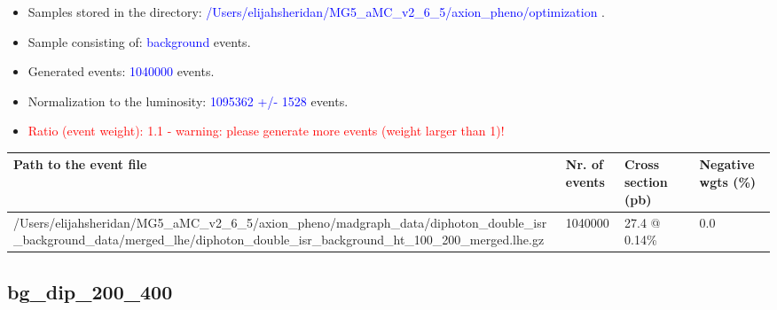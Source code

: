 \documentclass[a4paper, 10pt]{article}
\begin{document}
\begin{itemize}
  \item Samples stored in the directory: \textcolor{blue}{/\-Users/\-elijahsheridan/\-MG5\_aMC\_v2\_6\_5/\-axion\_pheno/\-optimization} .
   \item Sample consisting of: \textcolor{blue}{background}  events.
   \item Generated events: \textcolor{blue}{1040000 }  events.
   \item Normalization to the luminosity: \textcolor{blue}{1095362}\textcolor{blue}{ +/\-- }\textcolor{blue}{1528 }  events.
   \item\textcolor{red}{Ratio (event weight): }\textcolor{red}{1.1 }\textcolor{red}{ - warning: please generate more events (weight larger than 1)!}
\textcolor{red}{}
\end{itemize}
\begin{table}[H]
  \begin{center}
    \begin{tabular}{|m{55.0mm}|m{25.0mm}|m{30.0mm}|m{30.0mm}|}
      \hline
      {\cellcolor{yellow}         Path to the event file}& {\cellcolor{yellow}         Nr. of events}& {\cellcolor{yellow}         Cross section (pb)}& {\cellcolor{yellow}         Negative wgts (\%)}\\
      \hline
      {\cellcolor{white}          /\-Users/\-elijahsheridan/\-MG5\_aMC\_v2\_6\_5/\-axion\_pheno/\-madgraph\_data/\-diphoton\_double\_isr\_background\_data/\-merged\_lhe/\-diphoton\_double\_isr\_background\_ht\_100\_200\_merged.lhe.gz}& {\cellcolor{white}          1040000}& {\cellcolor{white}          27.4 @ 0.14\%}& {\cellcolor{white}          0.0}\\
\hline
    \end{tabular}
  \end{center}
\end{table}

\subsection{ bg\_dip\_200\_400}
\end{document}
